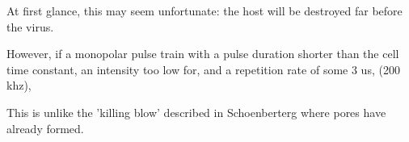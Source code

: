 \documentclass[fleqn,10pt]{article}
\begin{document}
At first glance, this may seem unfortunate: the host will be destroyed far before the virus.

However, if a monopolar pulse train with a pulse duration shorter than the cell time constant, an intensity too low for, and a repetition rate of some 3 us, (200 khz), 

This is unlike the 'killing blow' described in Schoenberterg where pores have already formed.


















\end{document}
